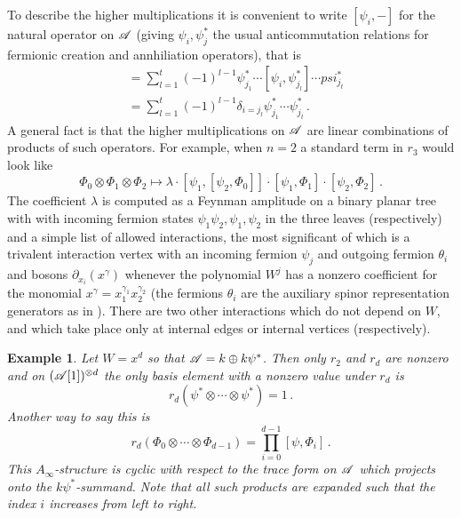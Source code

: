 \documentclass[english,letter paper,12pt,leqno]{article}
\theoremstyle{example}
\newtheorem{example}[theorem]{Example}
\numberwithin{equation}{section}
\begin{document}
To describe the higher multiplications it is convenient to write $[ \psi_i, - ]$ for the natural operator on $\mathscr{A}$ (giving $\psi_i, \psi_j^*$ the usual anticommutation relations for fermionic creation and annhiliation operators), that is
\begin{align*}
[ \psi_i, \psi_{j_1}^* \cdots \psi_{j_t}^* ] &= \sum_{l=1}^t (-1)^{l-1} \psi_{j_1}^* \cdots [\psi_i, \psi_{j_l}^* ] \cdots psi_{j_t}^*\\
&= \sum_{l=1}^t (-1)^{l-1} \delta_{i=j_l} \psi_{j_1}^* \cdots \psi_{j_t}^*\,.
\end{align*}
A general fact is that the higher multiplications on $\mathscr{A}$ are linear combinations of products of such operators. For example, when $n = 2$ a standard term in $r_3$ would look like
\[
\Phi_0 \otimes \Phi_1 \otimes \Phi_2 \mapsto \lambda \cdot [ \psi_1, [ \psi_2, \Phi_0 ] ] \cdot [ \psi_1, \Phi_1 ] \cdot [ \psi_2, \Phi_2 ]\,.
\]
The coefficient $\lambda$ is computed as a Feynman amplitude on a binary planar tree with with incoming fermion states $\psi_1 \psi_2, \psi_1, \psi_2$ in the three leaves (respectively) and a simple list of allowed interactions, the most significant of which is a trivalent interaction vertex with an incoming fermion $\psi_j$ and outgoing fermion $\theta_i$ and bosons $\partial_{x_i}( x^\gamma )$ whenever the polynomial $W^j$ has a nonzero coefficient for the monomial $x^\gamma = x_1^{\gamma_1} x_2^{\gamma_2}$ (the fermions $\theta_i$ are the auxiliary spinor representation generators as in \cite{murfet}). There are two other interactions which do not depend on $W$, and which take place only at internal edges or internal vertices (respectively).

\begin{example} Let $W = x^d$ so that $\mathscr{A} = k \oplus k \psi^*$. Then only $r_2$ and $r_d$ are nonzero and on $(\mathscr{A}[1])^{\otimes d}$ the only basis element with a nonzero value under $r_d$ is
\[
r_d( \psi^* \otimes \cdots \otimes \psi^* ) = 1\,.
\]
Another way to say this is
\[
r_d( \Phi_0 \otimes \cdots \otimes \Phi_{d-1} ) = \prod_{i=0}^{d-1} [ \psi, \Phi_i ]\,.
\]
This $A_\infty$-structure is cyclic with respect to the trace form on $\mathscr{A}$ which projects onto the $k \psi^*$-summand. Note that all such products are expanded such that the index $i$ increases from left to right.
\end{example}
\end{document}
